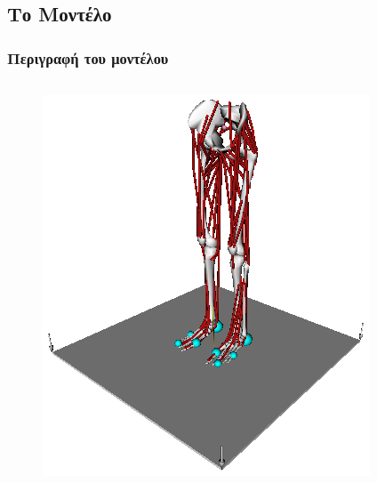 \documentclass[8pt,sans,mathserif]{beamer}%
\begin{document}
\subsection{Το Μοντέλο}
\begin{frame}
\frametitle{Περιγραφή του μοντέλου}

    \begin{columns}
        \begin{figure}[t]
            \includegraphics[width=1.0\linewidth, keepaspectratio]{fig/lower-limb-model.png}
        \end{figure}

        \pause


\end{columns}
\end{frame}
\end{document}
